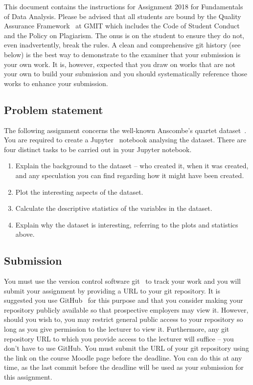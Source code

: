 \documentclass[12pt, a4paper, hidelinks]{scrartcl}
\title{\projectname}
\author{\modulename}
\date{Due: \duedate}
\newcommand{\modulename}{Fundamentals of Data Analysis}
\newcommand{\projectyear}{2018}
\newcommand{\projectname}{Assignment \projectyear}
\begin{document}
  
\maketitle

\noindent
This document contains the instructions for \projectname{} for \modulename{}.
Please be advised that all students are bound by the Quality Assurance Framework~\cite{gmitqaf} at GMIT which includes the Code of Student Conduct and the Policy on Plagiarism.
The onus is on the student to ensure they do not, even inadvertently, break the rules.
A clean and comprehensive git history (see below) is the best way to demonstrate to the examiner that your submission is your own work.
It is, however, expected that you draw on works that are not your own to build your submission and you should systematically reference those works to enhance your submission.


\subsection*{Problem statement}
  The following assignment concerns the well-known Anscombe's quartet dataset~\cite{anscombedataset}.
  You are required to create a Jupyter~\cite{jupyter} notebook analysing the dataset.
  There are four distinct tasks to be carried out in your Jupyter notebook.

  \begin{enumerate}
    \item Explain the background to the dataset -- who created it, when it was created, and any speculation you can find regarding how it might have been created.
    \item Plot the interesting aspects of the dataset.
    \item Calculate the descriptive statistics of the variables in the dataset.
    \item Explain why the dataset is interesting, referring to the plots and statistics above.
  \end{enumerate}

\subsection*{Submission}
  You must use the version control software git~\cite{git} to track your work and you will submit your assignment by providing a URL to your git repository.
  It is suggested you use GitHub~\cite{github} for this purpose and that you consider making your repository publicly available so that prospective employers may view it.
  However, should you wish to, you may restrict general public access to your repository so long as you give permission to the lecturer to view it.
  Furthermore, any git repository URL to which you provide access to the lecturer will suffice -- you don't have to use GitHub.  
  You must submit the URL of your git repository using the link on the course Moodle page before the deadline.
  You can do this at any time, as the last commit before the deadline will be used as your submission for this assignment.
\end{document}

